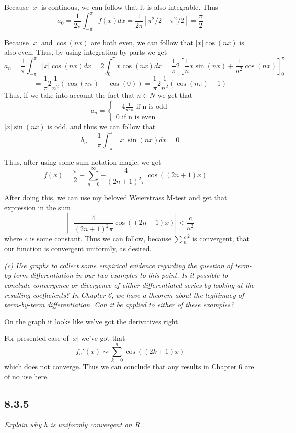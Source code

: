 \documentclass[11pt,oneside,titlepage]{book}
\begin{document}
Because $|x|$ is continous, we can follow that it is also integrable. Thus 
$$a_0 = \frac{1}{2 \pi} \int_{-\pi}^\pi{f(x) dx} =
\frac{1}{2 \pi}\left[ \pi^2/2 + \pi^2/2  \right] = \frac{\pi}{2}$$


Because $|x|$ and $\cos(nx)$ are both even, we can follow that $|x| \cos(nx)$ is also even.
Thus, by using integration by parts we get 
$$a_n = \frac 1 \pi \int_{-\pi}^\pi{|x| \cos (nx) dx} = 2 \int_{0}^\pi{x \cos (nx) dx} =
\frac 1 \pi 2 \left[\frac{1}{n} x \sin (nx) + \frac{1}{n^2}\cos (nx)\right]_0^\pi = $$
$$ = \frac 1 \pi 2 \frac{1}{n^2}(\cos (n \pi) - \cos(0) ) =
\frac 1 \pi 2 \frac{1}{n^2}(\cos (n \pi) - 1 ) $$
Thus, if we take into account the fact that $n \in N$ we get that
$$a_n =
\begin{cases}
  -4 \frac{1}{n^2 \pi} \text{ if n is odd} \\
  0 \text{ if n is even }
\end{cases}
$$
$|x| \sin (nx)$ is odd, and thus we can follow that 
$$b_n = \frac 1 \pi \int_{-\pi}^\pi{|x| \sin (nx) dx} = 0$$

Thus, after using some sum-notation magic, we get
$$f(x) = \frac{\pi}{2} + \sum_{n = 0}^\infty{- \frac{4}{(2n + 1)^ 2 \pi} \cos((2n + 1)x)} =
$$

After doing this, we can use my beloved Weierstrass M-test and get that expression in the sum
$$|- \frac{4}{(2n + 1)^ 2 \pi} \cos((2n + 1)x)| < \frac{c}{n^2}$$
where $c$ is some constant. Thus we can follow, because
$\sum \frac c n^2$ is convergent, that our function is convergent uniformly, as desired.

\textit{(c) Use graphs to collect some empirical evidence regarding the question of
  term-by-term differentiation in our two examples to this point. Is it possible to
  conclude convergence or divergence of either differentiated series by looking at the
  resulting coefficients? In Chapter 6, we have a theorem about the legitimacy of
  term-by-term differentiation. Can it be applied to either of these examples?}

On the graph it looks like we've got the derivatives right. 

For presented case of $|x|$ we've got that
$$f_n'(x) \sim \sum_{k = 0}^n{\cos((2k + 1)x)}$$
which does not converge. Thus we can conclude that any results in Chapter 6 are of no use here.

\subsection*{8.3.5}
\textit{Explain why $h$ is uniformly convergent on $R$.}
\end{document}
